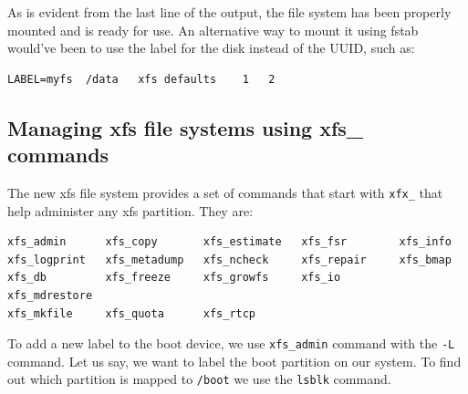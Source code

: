 \noindent
As is evident from the last line of the output, the file system has been properly mounted and is ready for use. An alternative way to mount it using fstab would've been to use the label for the disk instead of the UUID, such as:

\vspace{-15pt}
\begin{verbatim}
LABEL=myfs	/data	xfs	defaults	1	2
\end{verbatim}
\vspace{-10pt}

\subsection{Managing xfs file systems using xfs\_ commands}
The new xfs file system provides a set of commands that start with \verb|xfx_| that help administer any xfs partition. They are:

\vspace{-15pt}
\begin{verbatim}
xfs_admin      xfs_copy       xfs_estimate   xfs_fsr        xfs_info       
xfs_logprint   xfs_metadump   xfs_ncheck     xfs_repair     xfs_bmap       
xfs_db         xfs_freeze     xfs_growfs     xfs_io         xfs_mdrestore  
xfs_mkfile     xfs_quota      xfs_rtcp       
\end{verbatim}
\vspace{-10pt}

\noindent
To add a new label to the boot device, we use \verb|xfs_admin| command with the \verb|-L| command. Let us say, we want to label the boot partition on our system. To find out which partition is mapped to \verb|/boot| we use the \verb|lsblk| command. 

